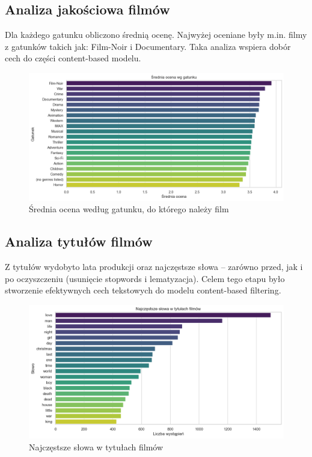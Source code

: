 \documentclass{article}
\begin{document}
\subsection{Analiza jakościowa filmów}
Dla każdego gatunku obliczono średnią ocenę. Najwyżej oceniane były m.in. filmy z gatunków takich jak: Film-Noir i Documentary. Taka analiza wspiera dobór cech do części content-based modelu.
\begin{figure}[H]
\centering
\includegraphics[width=1\textwidth]{pictures/mean_ocena_wg_gatunku.png}
\caption{Średnia ocena według gatunku, do którego należy film}
\label{fig:mean_ocena_wg_gatunku}
\end{figure}

\subsection{Analiza tytułów filmów}
Z tytułów wydobyto lata produkcji oraz najczęstsze słowa – zarówno przed, jak i po oczyszczeniu (usunięcie stopwords i lematyzacja). Celem tego etapu było stworzenie efektywnych cech tekstowych do modelu content-based filtering.

\begin{figure}[H]
\centering
\includegraphics[width=1\textwidth]{pictures/most_often_used_words.png}
\caption{Najczęstsze słowa w tytułach filmów}
\label{fig:most_often_used_words}
\end{figure}
\end{document}
